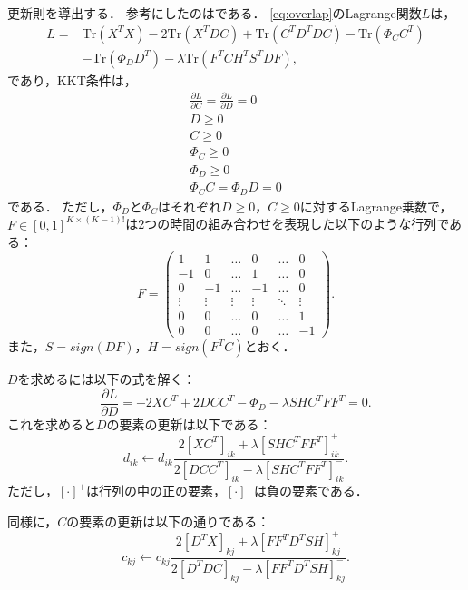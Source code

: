 更新則を導出する．
参考にしたのは\cite{Babaee2016}である．
\eqref{eq:overlap}のLagrange関数$L$は，
\begin{align}
	L = &\text{Tr}(X^TX) - 2 \text{Tr}(X^TDC) + \text{Tr}(C^TD^TDC) - \text{Tr}(\Phi_C C^T)\\
	&- \text{Tr}(\Phi_D D^T) - \lambda \text{Tr} (F^T C H^T S^T D F),
\end{align}
であり，KKT条件は，
\begin{align}
	\frac{\partial L}{\partial C} = \frac{\partial L}{\partial D} = 0 \\
	D \geq 0 \\
	C \geq 0 \\
	\Phi_C \geq 0 \\
	\Phi_D \geq 0 \\
	\Phi_C C = \Phi_D D = 0
\end{align}
である．
ただし，$\Phi_D$と$\Phi_C$はそれぞれ$D \geq 0$，$C \geq 0$に対するLagrange乗数で，$F \in [0,1]^{K \times (K-1)!}$は2つの時間の組み合わせを表現した以下のような行列である：
\begin{equation}
	F = \left(
    \begin{array}{cccccc}
			1 & 1 & \ldots & 0 & \ldots & 0 \\
			-1 & 0 & \ldots & 1 & \ldots & 0 \\
			0 & -1 & \ldots & -1 & \ldots & 0 \\
			\vdots & \vdots & \vdots & \vdots & \ddots & \vdots \\
			0 & 0 & \ldots & 0 & \ldots & 1 \\
			0 & 0 & \ldots & 0 & \ldots & -1
    \end{array}
  \right).
\end{equation}
また，$S = sign(DF)$，$H = sign(F^TC)$とおく．

$D$を求めるには以下の式を解く：
\begin{equation}
	\frac{\partial L}{\partial D} = - 2 X C^T + 2 DCC^T - \Phi_D - \lambda SHC^T FF^T = 0.
\end{equation}
これを求めると$D$の要素の更新は以下である：
\begin{equation}
	d_{ik} \leftarrow d_{ik} \frac{2[XC^T]_{ik} + \lambda [SHC^T FF^T]_{ik}^+}{2[DCC^T]_{ik} - \lambda [SHC^T FF^T]_{ik}^-}.
\end{equation}
ただし，$[\cdot]^+$は行列の中の正の要素，$[\cdot]^-$は負の要素である．

同様に，$C$の要素の更新は以下の通りである：
\begin{equation}
	c_{kj} \leftarrow c_{kj} \frac{2[D^T X]_{kj} + \lambda [FF^T D^T SH]_{kj}^+}{2[D^T DC]_{kj} - \lambda [FF^T D^T SH]_{kj}^-}.
\end{equation}


